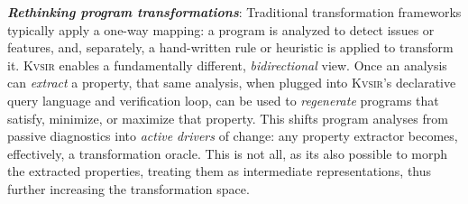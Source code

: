 \documentclass[sigplan,review,anonymous,10pt]{acmart}
\newcommand{\sys}{{\scshape Kv{\textalpha}sir}\xspace}
\newcommand{\heading}[1]{\vspace{2pt}\noindent\textbf{\emph{#1}}:\enspace}
\begin{document}
\heading{Rethinking program transformations}
Traditional transformation frameworks typically apply a one-way mapping: 
a program is analyzed to detect issues or features, and, separately, 
a hand-written rule or heuristic is applied to transform it. 
\sys enables a fundamentally different, \emph{bidirectional} view. 
Once an analysis can \emph{extract} a property,
that same analysis, when plugged into \sys's declarative query language and 
verification loop, can be used to \emph{regenerate} programs that 
satisfy, minimize, or maximize that property. 
This shifts program analyses from passive diagnostics into \emph{active drivers} 
of change: any property extractor becomes, effectively, a transformation oracle. 
This is not all, as 
its also possible to morph the extracted properties,
treating them as intermediate representations, thus further increasing 
the transformation space.


\end{document}
